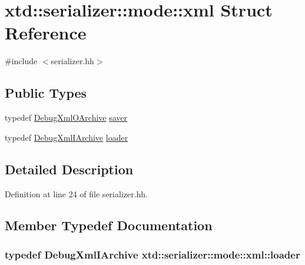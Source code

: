 \hypertarget{structxtd_1_1serializer_1_1mode_1_1xml}{}\section{xtd\+:\+:serializer\+:\+:mode\+:\+:xml Struct Reference}
\label{structxtd_1_1serializer_1_1mode_1_1xml}


{\ttfamily \#include $<$serializer.\+hh$>$}

\subsection*{Public Types}
\begin{DoxyCompactItemize}
\item 
typedef \hyperlink{classxtd_1_1serializer_1_1DebugXmlOArchive}{Debug\+Xml\+O\+Archive} \hyperlink{structxtd_1_1serializer_1_1mode_1_1xml_a630743906b9808c209a9d7bce84427bc}{saver}
\item 
typedef \hyperlink{classxtd_1_1serializer_1_1DebugXmlIArchive}{Debug\+Xml\+I\+Archive} \hyperlink{structxtd_1_1serializer_1_1mode_1_1xml_a645aca92f671ad196a17282c44a69a83}{loader}
\end{DoxyCompactItemize}


\subsection{Detailed Description}


Definition at line 24 of file serializer.\+hh.



\subsection{Member Typedef Documentation}
\subsubsection[{\texorpdfstring{loader}{loader}}]{\setlength{\rightskip}{0pt plus 5cm}typedef {\bf Debug\+Xml\+I\+Archive} {\bf xtd\+::serializer\+::mode\+::xml\+::loader}}\hypertarget{structxtd_1_1serializer_1_1mode_1_1xml_a645aca92f671ad196a17282c44a69a83}{}\label{structxtd_1_1serializer_1_1mode_1_1xml_a645aca92f671ad196a17282c44a69a83}



